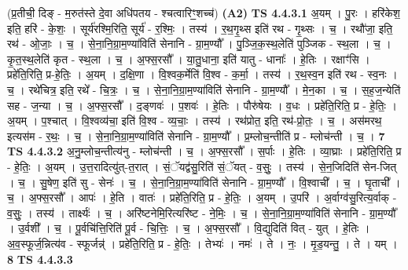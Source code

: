 \documentclass[17pt]{extarticle}
\begin{document}
                  \newline
                      (प्र॒तीची॒ दिङ् - म॒रुत॑स्ते दे॒वा अधि॑पतय - श्चत्वारिꣳ॒॒शच्च॑)  \textbf{(A2)} \newline \newline
                                \textbf{ TS 4.4.3.1} \newline
                  अ॒यम् । पु॒रः । हरि॑केश॒ इति॒ हरि॑ - के॒शः॒ । सूर्य॑रश्मि॒रिति॒ सूर्य॑ - र॒श्मिः॒ । तस्य॑ । र॒थ॒गृ॒थ्स इति॑ रथ - गृ॒थ्सः । च॒ । रथौ॑जा॒ इति॒ रथ॑ - ओ॒जाः॒ । च॒ । से॒ना॒नि॒ग्रा॒म॒ण्या॑विति॑ सेनानि - ग्रा॒म॒ण्यौ᳚ । पु॒ञ्जि॒क॒स्थ॒लेति॑ पुञ्जिक - स्थ॒ला । च॒ । कृ॒त॒स्थ॒लेति॑ कृत - स्थ॒ला । च॒ । अ॒फ्स॒रसौ᳚ । या॒तु॒धाना॒ इति॑ यातु - धानाः᳚ । हे॒तिः । रक्षाꣳ॑सि । प्रहे॑ति॒रिति॒ प्र-हे॒तिः॒ । अ॒यम् । द॒क्षि॒णा । वि॒श्वक॒र्मेति॑ वि॒श्व - क॒र्मा॒ । तस्य॑ । र॒थ॒स्व॒न इति॑ रथ - स्व॒नः । च॒ । रथे॑चित्र॒ इति॒ रथे᳚ - चि॒त्रः॒ । च॒ । से॒ना॒नि॒ग्रा॒म॒ण्या॑विति॑ सेनानि - ग्रा॒म॒ण्यौ᳚ । मे॒न॒का । च॒ । स॒ह॒ज॒न्येति॑ सह - ज॒न्या । च॒ । अ॒फ्स॒रसौ᳚ । द॒ङ्णवः॑ । प॒शवः॑ । हे॒तिः । पौरु॑षेयः । व॒धः । प्रहे॑ति॒रिति॒ प्र - हे॒तिः॒ । अ॒यम् । प॒श्चात् । वि॒श्वव्य॑चा॒ इति॑ वि॒श्व - व्य॒चाः॒ । तस्य॑ । रथ॑प्रोत॒ इति॒ रथ॑-प्रो॒तः॒ । च॒ । अस॑मरथ॒ इत्यस॑म - र॒थः॒ । च॒ । से॒ना॒नि॒ग्रा॒म॒ण्या॑विति॑ सेनानि - ग्रा॒म॒ण्यौ᳚ । प्र॒म्लोच॒न्तीति॑ प्र - म्लोच॑न्ती । च॒ । \textbf{  7} \newline
                  \newline
                                \textbf{ TS 4.4.3.2} \newline
                  अ॒नु॒म्लोच॒न्तीत्य॑नु - म्लोच॑न्ती । च॒ । अ॒फ्स॒रसौ᳚ । स॒र्पाः । हे॒तिः । व्या॒घ्राः । प्रहे॑ति॒रिति॒ प्र - हे॒तिः॒ । अ॒यम् । उ॒त्त॒रादित्यु॑त्-त॒रात् । सं॒ॅयद्व॑सु॒रिति॑ सं॒ॅयत् - व॒सुः॒ । तस्य॑ । से॒न॒जिदिति॑ सेन-जित् । च॒ । सु॒षेण॒ इति॑ सु - सेनः॑ । च॒ । से॒ना॒नि॒ग्रा॒म॒ण्या॑विति॑ सेनानि - ग्रा॒म॒ण्यौ᳚ । वि॒श्वाची᳚ । च॒ । घृ॒ताची᳚ । च॒ । अ॒फ्स॒रसौ᳚ । आपः॑ । हे॒ति । वातः॑ । प्रहे॑ति॒रिति॒ प्र - हे॒तिः॒ । अ॒यम् । उ॒परि॑ । अ॒र्वाग्व॑सु॒रित्य॒र्वाक् - व॒सुः॒ । तस्य॑ । तार्क्ष्यः॑ । च॒ । अरि॑ष्टनेमि॒रित्यरि॑ष्ट - ने॒मिः॒ । च॒ । से॒ना॒नि॒ग्रा॒म॒ण्या॑विति॑ सेनानि - ग्रा॒म॒ण्यौ᳚ । उ॒र्वशी᳚ । च॒ । पू॒र्वचि॑त्ति॒रिति॑ पू॒र्व - चि॒त्तिः॒ । च॒ । अ॒फ्स॒रसौ᳚ । वि॒द्युदिति॑ वित् - युत् । हे॒तिः । अ॒व॒स्फूर्ज॒न्नित्य॑व - स्फूर्जन्न्॑ । प्रहे॑ति॒रिति॒ प्र - हे॒तिः॒ । तेभ्यः॑ । नमः॑ । ते । नः॒ । मृ॒ड॒यन्तु॒ । ते । यम् । \textbf{  8} \newline
                  \newline
                                \textbf{ TS 4.4.3.3} \newline
\end{document}

